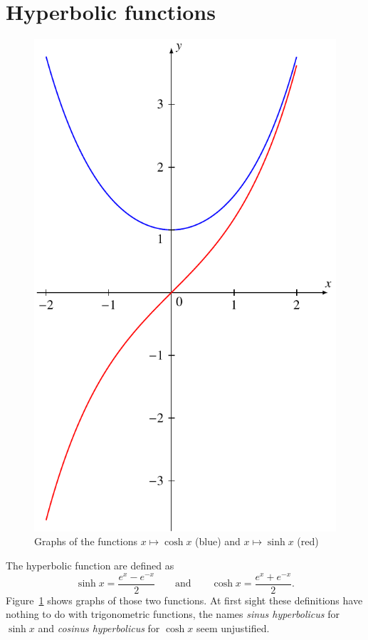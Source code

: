 %
%
%
\section{Hyperbolic functions}
\begin{figure}
\centering
\includegraphics{b-sinh/images/sinhcosh.pdf}
\caption{Graphs of the functions 
$x\mapsto\cosh x$ (blue)
and $x\mapsto\sinh x$ (red)
\label{hyp:graphen}}
\end{figure}
The hyperbolic function are defined as
\[
\sinh x =\frac{e^x-e^{-x}}2
\qquad\text{and}\qquad
\cosh x = \frac{e^x+e^{-x}}2.
\]
Figure~\ref{hyp:graphen} shows graphs of those two functions.
At first sight these definitions have nothing to do with trigonometric
functions, the names {\em sinus hyperbolicus} for $\sinh x$ and
{\em cosinus hyperbolicus} for $\cosh x$ seem unjustified.

